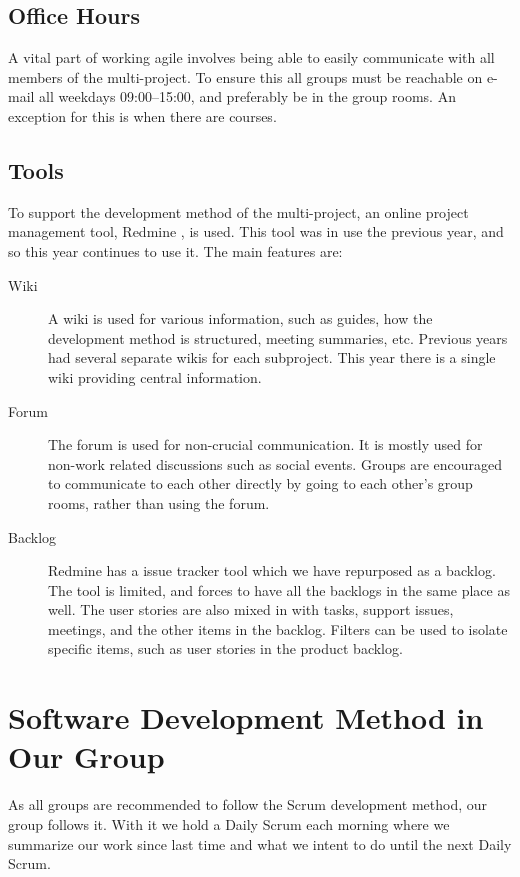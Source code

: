 \subsection{Office Hours}
A vital part of working agile involves being able to easily communicate with all members of the multi-project. To ensure this all groups must be reachable on e-mail all weekdays 09:00--15:00, and preferably be in the group rooms. An exception for this is when there are courses.

\subsection{Tools}\label{sec:tools}
To support the development method of the multi-project, an online project management tool, Redmine \parencite{redmine-website}, is used. This tool was in use the previous year, and so this year continues to use it. The main features are:

\begin{description}
  \item[Wiki] A wiki is used for various information, such as guides, how the development method is structured, meeting summaries, etc. Previous years had several separate wikis for each subproject. This year there is a single wiki providing central information.
  \item[Forum] The forum is used for non-crucial communication. It is mostly used for non-work related discussions such as social events. Groups are encouraged to communicate to each other directly by going to each other's group rooms, rather than using the forum.
  \item[Backlog] Redmine has a issue tracker tool which we have repurposed as a backlog. The tool is limited, and forces to have all the backlogs in the same place as well. The user stories are also mixed in with tasks, support issues, meetings, and the other items in the backlog. Filters can be used to isolate specific items, such as user stories in the product backlog.
\end{description}

\section{Software Development Method in Our Group}\label{sec:swmethod_ourgroup}
As all groups are recommended to follow the Scrum development method, our group follows it. With it we hold a Daily Scrum each morning where we summarize our work since last time and what we intent to do until the next Daily Scrum.

